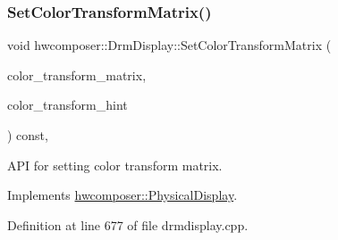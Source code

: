 \subsubsection{\texorpdfstring{Set\+Color\+Transform\+Matrix()}{SetColorTransformMatrix()}}
{\footnotesize\ttfamily void hwcomposer\+::\+Drm\+Display\+::\+Set\+Color\+Transform\+Matrix (\begin{DoxyParamCaption}\item[{const float $\ast$}]{color\+\_\+transform\+\_\+matrix,  }\item[{\mbox{\hyperlink{hwcdefs_8h_a1a2c55aec4fbd12a1e323f2bdb3e9b88}{H\+W\+C\+Color\+Transform}}}]{color\+\_\+transform\+\_\+hint }\end{DoxyParamCaption}) const\hspace{0.3cm}{\ttfamily [override]}, {\ttfamily [virtual]}}

A\+PI for setting color transform matrix. 

Implements \mbox{\hyperlink{classhwcomposer_1_1PhysicalDisplay_a89ded7e09902c8c3c707c041412f1c02}{hwcomposer\+::\+Physical\+Display}}.



Definition at line 677 of file drmdisplay.\+cpp.


